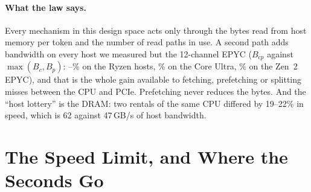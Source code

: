 \documentclass[10pt,twocolumn]{article}
\begin{document}
\paragraph{What the law says.} Every mechanism in this design space acts only through the bytes read from host memory
per token and the number of read paths in use. A second path adds bandwidth on every host we
measured but the 12-channel EPYC ($B_{cp}$ against $\max(B_c,B_p)$: \secondMin--\secondMax\% on the Ryzen hosts, \secondUltra\% on the
Core Ultra, \secondEpyc\% on the Zen~2 EPYC), and that is the whole gain available to fetching, prefetching or splitting
misses between the CPU and PCIe. Prefetching never reduces the bytes. And the ``host lottery'' is the DRAM: two
rentals of the same CPU differed by 19--22\% in speed, which is 62 against 47\,GB/s of host bandwidth.

\section{The Speed Limit, and Where the Seconds Go}\label{sec:limit}
\end{document}
